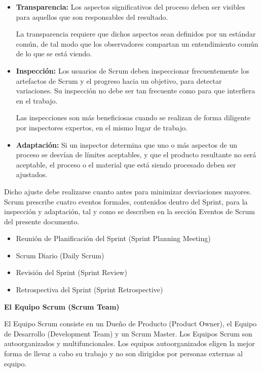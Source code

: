 \documentclass[12pt]{report}%
\begin{document}
\begin{itemize}

\item \textbf{ Transparencia: }Los aspectos significativos del proceso deben ser visibles para aquellos que son responsables del resultado.

La transparencia requiere que dichos aspectos sean definidos por un estándar común, de tal modo que los observadores compartan un entendimiento común de lo que se está viendo.


\item \textbf{ Inspección:  }Los usuarios de Scrum deben inspeccionar frecuentemente los artefactos de Scrum y el progreso hacia un objetivo, para detectar variaciones. Su inspección no debe ser tan frecuente como para que interfiera en el trabajo. 

Las inspecciones son más beneficiosas cuando se realizan de forma diligente por inspectores expertos, en el mismo lugar de trabajo.


\item \textbf{ Adaptación: }Si un inspector determina que uno o más aspectos de un proceso se desvían de límites aceptables, y que el producto resultante no será aceptable, el proceso o el material que está siendo procesado deben ser ajustados. 

\end{itemize}
Dicho ajuste debe realizarse cuanto antes para minimizar desviaciones mayores. Scrum prescribe cuatro eventos formales, contenidos dentro del Sprint, para la inspección y adaptación, tal y como se describen en la sección Eventos de Scrum del presente documento. 

\begin{itemize}
\item Reunión de Planificación del Sprint (Sprint Planning Meeting) 
\item Scrum Diario (Daily Scrum) 
\item Revisión del Sprint (Sprint Review) 
\item Retrospectiva del Sprint (Sprint Retrospective) 
 
\end{itemize}
\textbf { El Equipo Scrum (Scrum Team) }

El Equipo Scrum consiste en un Dueño de Producto (Product Owner), el Equipo de Desarrollo (Development Team) y un Scrum Master. Los Equipos Scrum son autoorganizados y multifuncionales. Los equipos autoorganizados eligen la mejor forma de llevar a cabo su trabajo y no son dirigidos por personas externas al equipo.
\end{document}
